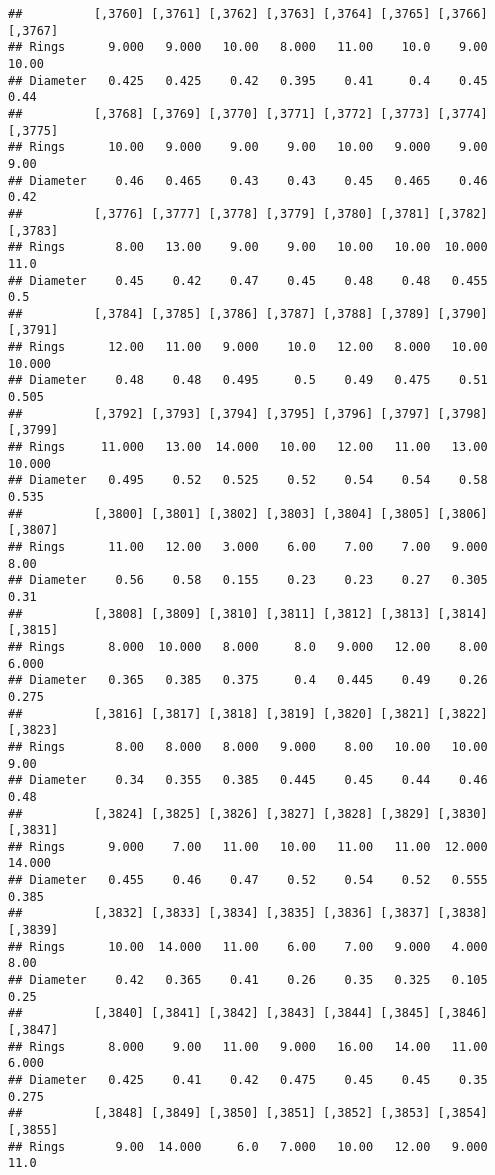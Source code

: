 \documentclass[
]{article}
\begin{document}
\begin{verbatim}
##          [,3760] [,3761] [,3762] [,3763] [,3764] [,3765] [,3766] [,3767]
## Rings      9.000   9.000   10.00   8.000   11.00    10.0    9.00   10.00
## Diameter   0.425   0.425    0.42   0.395    0.41     0.4    0.45    0.44
##          [,3768] [,3769] [,3770] [,3771] [,3772] [,3773] [,3774] [,3775]
## Rings      10.00   9.000    9.00    9.00   10.00   9.000    9.00    9.00
## Diameter    0.46   0.465    0.43    0.43    0.45   0.465    0.46    0.42
##          [,3776] [,3777] [,3778] [,3779] [,3780] [,3781] [,3782] [,3783]
## Rings       8.00   13.00    9.00    9.00   10.00   10.00  10.000    11.0
## Diameter    0.45    0.42    0.47    0.45    0.48    0.48   0.455     0.5
##          [,3784] [,3785] [,3786] [,3787] [,3788] [,3789] [,3790] [,3791]
## Rings      12.00   11.00   9.000    10.0   12.00   8.000   10.00  10.000
## Diameter    0.48    0.48   0.495     0.5    0.49   0.475    0.51   0.505
##          [,3792] [,3793] [,3794] [,3795] [,3796] [,3797] [,3798] [,3799]
## Rings     11.000   13.00  14.000   10.00   12.00   11.00   13.00  10.000
## Diameter   0.495    0.52   0.525    0.52    0.54    0.54    0.58   0.535
##          [,3800] [,3801] [,3802] [,3803] [,3804] [,3805] [,3806] [,3807]
## Rings      11.00   12.00   3.000    6.00    7.00    7.00   9.000    8.00
## Diameter    0.56    0.58   0.155    0.23    0.23    0.27   0.305    0.31
##          [,3808] [,3809] [,3810] [,3811] [,3812] [,3813] [,3814] [,3815]
## Rings      8.000  10.000   8.000     8.0   9.000   12.00    8.00   6.000
## Diameter   0.365   0.385   0.375     0.4   0.445    0.49    0.26   0.275
##          [,3816] [,3817] [,3818] [,3819] [,3820] [,3821] [,3822] [,3823]
## Rings       8.00   8.000   8.000   9.000    8.00   10.00   10.00    9.00
## Diameter    0.34   0.355   0.385   0.445    0.45    0.44    0.46    0.48
##          [,3824] [,3825] [,3826] [,3827] [,3828] [,3829] [,3830] [,3831]
## Rings      9.000    7.00   11.00   10.00   11.00   11.00  12.000  14.000
## Diameter   0.455    0.46    0.47    0.52    0.54    0.52   0.555   0.385
##          [,3832] [,3833] [,3834] [,3835] [,3836] [,3837] [,3838] [,3839]
## Rings      10.00  14.000   11.00    6.00    7.00   9.000   4.000    8.00
## Diameter    0.42   0.365    0.41    0.26    0.35   0.325   0.105    0.25
##          [,3840] [,3841] [,3842] [,3843] [,3844] [,3845] [,3846] [,3847]
## Rings      8.000    9.00   11.00   9.000   16.00   14.00   11.00   6.000
## Diameter   0.425    0.41    0.42   0.475    0.45    0.45    0.35   0.275
##          [,3848] [,3849] [,3850] [,3851] [,3852] [,3853] [,3854] [,3855]
## Rings       9.00  14.000     6.0   7.000   10.00   12.00   9.000    11.0

\end{verbatim}
\end{document}
